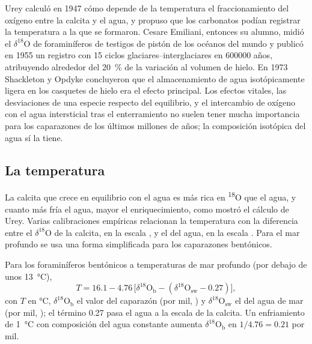 \begin{history}
Urey calculó en 1947 cómo depende de la temperatura el fraccionamiento del oxígeno entre la calcita y el agua,
y propuso que los carbonatos podían registrar la temperatura a la que se formaron. Cesare
Emiliani, entonces su alumno, midió el $\delta^{18}$O de foraminíferos de testigos de pistón de los
océanos del mundo y publicó en 1955 un registro con 15 ciclos glaciares--interglaciares en
\num{600000} años, atribuyendo alrededor del \qty{20}{\percent} de la variación al volumen de hielo.
En 1973 Shackleton y Opdyke concluyeron que el almacenamiento de agua isotópicamente ligera en los
casquetes de hielo era el efecto principal. Los efectos vitales, las desviaciones de una especie respecto del equilibrio,
y el intercambio de oxígeno con el agua intersticial tras el enterramiento no suelen tener mucha importancia para los
caparazones de los últimos millones de años; la composición isotópica del agua sí la tiene.
\end{history}

\subsection*{La temperatura}

La calcita que crece en equilibrio con el agua es más rica en \textsuperscript{18}O que el agua,
y cuanto más fría el agua, mayor el enriquecimiento, como mostró el cálculo de Urey. Varias
calibraciones empíricas relacionan
la temperatura con la diferencia entre el $\delta^{18}$O de la calcita, en la escala , y
el del agua, en la escala . Para el mar profundo se usa una forma simplificada para los caparazones
bentónicos.

\begin{proposition}\label{prop:b2:climate-proxies:benthic}
Para los foraminíferos bentónicos a temperaturas de mar profundo (por debajo de unos \qty{13}{\celsius}),
\[
  T = 16.1 - 4.76\,\bigl[\delta^{18}\mathrm{O}_{\mathrm{b}} - (\delta^{18}\mathrm{O}_{\mathrm{sw}} -
  0.27)\bigr],
\]
con $T$ en \unit{\celsius}, $\delta^{18}\mathrm{O}_{\mathrm{b}}$ el valor del caparazón (por mil,
) y $\delta^{18}\mathrm{O}_{\mathrm{sw}}$ el del agua de mar (por mil, ); el término
0.27 pasa el agua a la escala de la calcita. Un enfriamiento de \qty{1}{\celsius} con composición del agua
constante aumenta $\delta^{18}\mathrm{O}_{\mathrm{b}}$ en $1/4.76 = 0.21$ por mil.
\end{proposition}
\admitted

